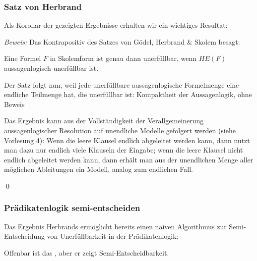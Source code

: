 \documentclass[aspectratio=1610,onlymath]{beamer}
\begin{document}
\begin{frame}\frametitle{Satz von Herbrand}

Als Korollar der gezeigten Ergebnisse erhalten wir ein wichtiges Resultat:


\pause\emph{Beweis:} Das Kontrapositiv des Satzes von Gödel, Herbrand \& Skolem besagt:\medskip

Eine Formel $F$ in Skolemform ist genau dann unerfüllbar, wenn $HE(F)$ aussagenlogisch unerfüllbar ist.\bigskip

Der Satz folgt nun, weil jede unerfüllbare aussagenlogische Formelmenge eine endliche
Teilmenge hat, die unerfüllbar ist: \alert{Kompaktheit der Aussagenlogik}, ohne Beweis\\[1ex]
{\tiny
\textcolor{devilscss}{Das Ergebnis kann aus der Vollständigkeit der Verallgemeinerung aussagenlogischer Resolution auf unendliche Modelle gefolgert werden (siehe Vorlesung 4): Wenn die leere Klausel endlich abgeleitet werden kann, dann nutzt man dazu nur endlich viele Klauseln der Eingabe; wenn die leere Klausel nicht endlich abgeleitet werden kann, dann erhält man aus der unendlichen Menge aller möglichen Ableitungen ein Modell, analog zum endlichen Fall.}

}\qed

\end{frame}

\begin{frame}\frametitle{Prädikatenlogik semi-entscheiden}

Das Ergebnis Herbrands ermöglicht bereits einen naiven Algorithmus zur Semi-Entscheidung von Unerfüllbarkeit in der Prädikatenlogik:\bigskip

\medskip

Offenbar ist das , aber er zeigt Semi-Entscheidbarkeit.

\end{frame}
\end{document}

